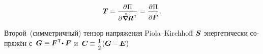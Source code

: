 \begin{otherlanguage}{russian}
\nopagebreak\vspace{-0.12em}\begin{equation}
\firstpiolakirchhoffstress \hspace{-0.1ex}
= \scalebox{0.92}{$ \displaystyle \frac{\partial \hspace{.1ex} \Pi}{\raisemath{-0.4em}{\partial \hspace{.1ex} \smash{\boldnablacircled} \hspace{-0.16ex} \bm{R}^{\hspace{.12ex}\T}}} $}
= \scalebox{0.92}{$ \displaystyle \frac{\hspace{.2ex} \partial \hspace{.1ex} \Pi \hspace{.2ex}}{\raisemath{-0.25em}{\partial \bm{F}}} $} \hspace{.25ex}.
\vspace{.1em}\end{equation}

Второй~(симметричный) тензор напряжения Piola--Kirch\-hoff $\bm{S}$ энергетически сопряжён с~${\bm{G} \equiv \hspace{-0.1ex} \bm{F}^{\hspace{.1ex}\T} \hspace{-0.36ex} \dotp \bm{F}}$ и~${\bm{C} \hspace{-0.1ex} \equiv \smalldisplaystyleonehalf \hspace{.1ex} (\bm{G} - \hspace{-0.12ex} \bm{E} \hspace{.1ex})}$


\end{otherlanguage}
